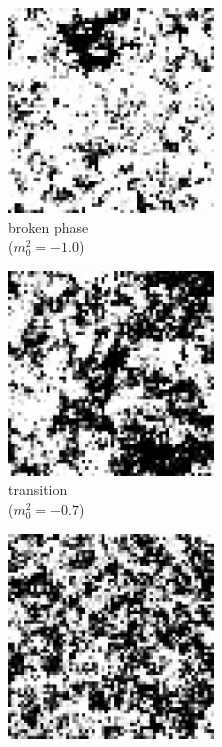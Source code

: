 \documentclass[12pt]{report}
\begin{document}
\begin{figure}[h]
    \begin{center}
      \begin{subfigure}[b]{0.3\textwidth}\centering
        \includegraphics[width=0.6\textwidth]{imgs/broken.png}
        \caption{broken phase \\($m_0^2=-1.0$)}
      \end{subfigure}%
      \hfill
      \begin{subfigure}[b]{0.3\textwidth}\centering
        \includegraphics[width=0.6\textwidth]{imgs/transition.png}
        \caption{transition \\($m_0^2=-0.7$)}
      \end{subfigure}%
      \hfill
      \begin{subfigure}[b]{0.3\textwidth}\centering
        \includegraphics[width=0.6\textwidth]{imgs/symmetric.png}

\end{subfigure}
\end{center}
\end{figure}
\end{document}
